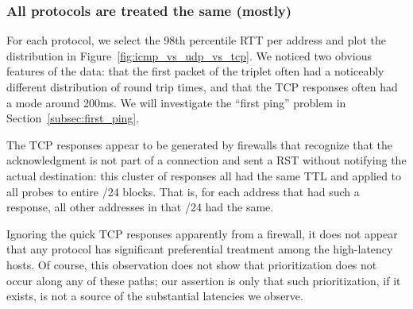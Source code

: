 \subsubsection*{All protocols are treated the same (mostly)}

For each protocol, we select the 98th percentile RTT per address and
plot the distribution in Figure~\ref{fig:icmp_vs_udp_vs_tcp}. 
%
We noticed two obvious features of
the data: that the first packet of the triplet often had a
noticeably different distribution of round trip times, and
that the TCP responses often had a mode around 200ms.
%
We will investigate
the ``first ping'' problem in Section~\ref{subsec:first_ping}.

The TCP responses appear to be generated by firewalls that
recognize that the acknowledgment is not part of a
connection and sent a RST without notifying the actual
destination: this cluster of responses all had the same TTL
and applied to all probes to entire /24 blocks.  That is,
for each address that had such a response, all other
addresses in that /24 had the same.

Ignoring the quick TCP responses apparently from a firewall,
it does not appear that any protocol has significant
preferential treatment among the high-latency hosts.  Of
course, this observation does not show that prioritization
does not occur along any of these paths; our assertion is
only that such prioritization, if it exists, is not a source
of the substantial latencies we observe.



% 
% 


